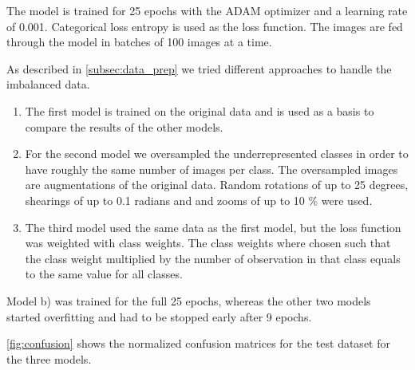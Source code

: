 \documentclass[12pt]{article}
\begin{document}
The model is trained for 25 epochs with the ADAM optimizer and a learning rate of 0.001. Categorical loss entropy is used as the loss function. The images are fed through the model in batches of 100 images at a time.

As described in \autoref{subsec:data_prep} we tried different approaches to handle the imbalanced data. 

\begin{enumerate}[label=(\alph*)]
\item The first model is trained on the original data and is used as a basis to compare the results of the other models.
\item For the second model we oversampled the underrepresented classes in order to have roughly the same number of images per class. The oversampled images are augmentations of the original data. Random rotations of up to 25 degrees, shearings of up to 0.1 radians and and zooms of up to 10 \% were used.
\item The third model used the same data as the first model, but the loss function was weighted with class weights. The class weights where chosen such that the class weight multiplied by the number of observation in that class equals to the same value for all classes.
\end{enumerate}

Model b) was trained for the full 25 epochs, whereas the other two models started overfitting and had to be stopped early after 9 epochs.

\autoref{fig:confusion} shows the normalized confusion matrices for the test dataset for the three models.
\end{document}
